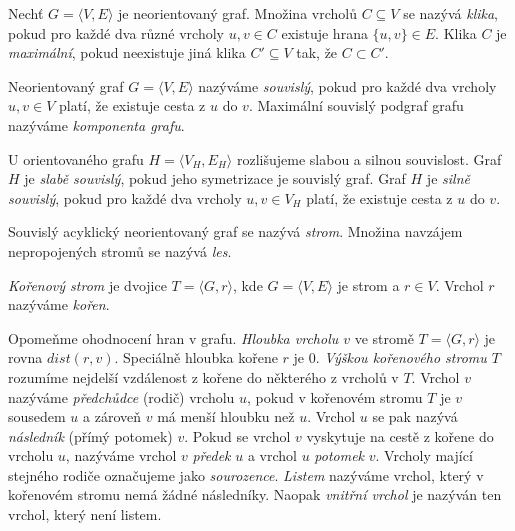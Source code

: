 \documentclass[
  program=infoi,
  biblatex=true,
  figures=true,
  glossaries=false,
  index,
  sourcecodes=true
]{kidiplom}
\begin{document}
\begin{definition}[Klika]
Nechť $G = \langle V,E\rangle$ je neorientovaný graf. Množina vrcholů $C \subseteq V$ se nazývá \textit{klika}, pokud pro každé dva různé vrcholy $u, v \in C$ existuje hrana $\{u, v \} \in E$. Klika $C$ je \textit{maximální}, pokud neexistuje jiná klika $C' \subseteq V$ tak, že $C \subset C'$.
\end{definition}

\begin{definition}
Neorientovaný graf $G = \langle V,E\rangle$ nazýváme \textit{souvislý}, pokud pro každé dva vrcholy $ u,v \in V $ platí, že existuje cesta z $u$ do $v$. Maximální souvislý podgraf grafu nazýváme \textit{komponenta grafu}.
\end{definition}

U orientovaného grafu $H = \langle V_H,E_H \rangle$ rozlišujeme slabou a silnou souvislost. Graf $H$ je \textit{slabě souvislý}, pokud jeho symetrizace je souvislý graf. Graf $H$ je \textit{silně souvislý}, pokud pro každé dva vrcholy $ u,v \in V_H $ platí, že existuje cesta z $u$ do $v$.

\begin{definition}
Souvislý acyklický neorientovaný graf se nazývá \textit{strom}. Množina navzájem nepropojených stromů se nazývá \textit{les}.
\end{definition}

\begin{definition}
\textit{Kořenový strom} je dvojice $T=\langle G,r \rangle$, kde $G=\langle V,E \rangle$ je strom a $r \in V$. Vrchol $r$ nazýváme \textit{kořen}.
\end{definition}

Opomeňme ohodnocení hran v grafu. \textit{Hloubka vrcholu $v$} ve stromě $T=\langle G,r \rangle$ je rovna $dist(r,v)$. Speciálně hloubka kořene $r$ je 0. \textit{Výškou kořenového stromu $T$} rozumíme nejdelší vzdálenost z kořene do některého z vrcholů v $T$.
Vrchol $v$ nazýváme \textit{předchůdce} (rodič) vrcholu $u$, pokud v kořenovém stromu $T$ je $v$ sousedem $u$ a zároveň $v$ má menší hloubku než $u$. Vrchol $u$ se pak nazývá \textit{následník} (přímý potomek) $v$. Pokud se vrchol $v$ vyskytuje na cestě z kořene do vrcholu $u$, nazýváme vrchol $v$ \textit{předek} $u$ a vrchol $u$ \textit{potomek} $v$. Vrcholy mající stejného rodiče označujeme jako \textit{sourozence}. \textit{Listem} nazýváme vrchol, který v kořenovém stromu nemá žádné následníky. Naopak \textit{vnitřní vrchol} je nazýván ten vrchol, který není listem.
\clearpage
\end{document}
